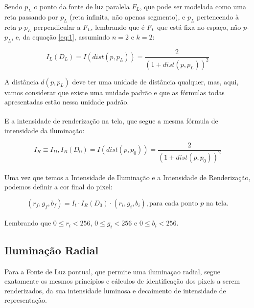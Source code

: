 \documentclass{article}
\begin{document}
	Sendo $p_L$ o ponto da fonte de luz paralela $F_L$, que pode ser modelada como uma reta passando por $p_L$ (reta infinita, não apenas segmento), e $p_L$ pertencendo à reta $p$-$p_L$ perpendicular a $F_L$, lembrando que é $F_L$ que está fixa no espaço, não $p$-$p_L$, e, da equação \ref{eq:1}, assumindo $n = 2$ e $k = 2$:
	
	\begin{equation} \label{eq:3}
		I_L(D_L) = I(dist(p, p_L)) =  \frac{2}{(1+dist(p, p_L))^2}
	\end{equation}
	
	A distância $d(p, p_L)$ deve ter uma unidade de distância qualquer, mas, aqui, vamos considerar que existe uma unidade padrão e que as fórmulas todas apresentadas estão nessa unidade padrão.
	
	\paragraph{}
	E a intensidade de renderização na tela, que segue a mesma fórmula de intensidade da iluminação:
	
	\begin{equation} \label{eq:4}
		I_R \equiv I_D, I_R(D_0) = I(dist(p, p_0)) = \frac{2}{(1+dist(p, p_0))^2}
	\end{equation}
	
	\paragraph{}
	Uma vez que temos a Intensidade de Iluminação e a Intensidade de Renderização, podemos definir a cor final do pixel:
	
	\begin{equation}
		(r_f, g_f, b_f) = I_t \cdot I_R(D_0) \cdot (r_i, g_i, b_i), \text{para cada ponto $p$ na tela}.
	\end{equation}
	
	\paragraph{}
	Lembrando que $0 \le r_i < 256$, $0 \le g_i < 256$ e $0 \le b_i < 256$.
	
	\subsection{Iluminação Radial}
	
	\paragraph{} 
	Para a Fonte de Luz pontual, que permite uma iluminaçao radial, segue exatamente os mesmos princípios e cálculos de identificação dos pixels a serem renderizados, da sua intensidade luminosa e decaimento de intensidade de representação. 
	
\end{document}
